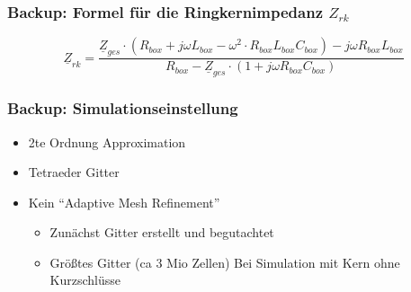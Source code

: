 \documentclass[accentcolor=tud9b, colorbacktitle, inverttitle]{tudbeamer}
\begin{document}
\begin{frame}
\begin{figure}[htb]
	\hspace{0.0312\textwidth}
\end{figure}
\end{frame}


\begin{frame}\frametitle{Backup: Formel f\"ur die Ringkernimpedanz $Z_{rk}$}
	\begin{equation}\label{eq:Zrk}
		\underline{Z}_{rk} = \frac{\underline{Z}_{ges}\cdot(R_{box}+j\omega L_{box}-\omega^2\cdot R_{box}L_{box}C_{box}) - j\omega R_{box}L_{box}}{R_{box}-\underline{Z}_{ges}\cdot(1+j\omega R_{box}C_{box})}
	\end{equation}
\end{frame}


\begin{frame}\frametitle{Backup: Simulationseinstellung}
\begin{itemize}
	\item 2te Ordnung Approximation
	\item Tetraeder Gitter
	\item Kein ``Adaptive Mesh Refinement''
	\begin{itemize}
		\item Zun\"achst Gitter erstellt und begutachtet
		\item Gr\"o\ss{}tes Gitter (ca 3 Mio Zellen) Bei Simulation mit Kern ohne Kurzschl\"usse
	\end{itemize}

\end{itemize}
\end{frame}
\end{document}
